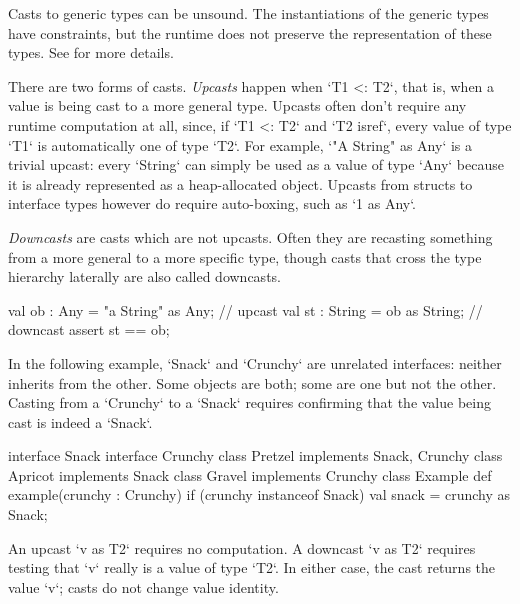 Casts to generic types can be unsound.   The instantiations of the generic
types have constraints, but the runtime does not preserve the representation
of these types.  See  for more details.

There are two forms of casts.  {\em Upcasts} happen when \xcd`T1 <: T2`, that
is, when a value is being cast to a more general type.  Upcasts often don't require
any runtime computation at all, since, if \xcd`T1 <: T2` and 
\xcd`T2 isref`, every value of type
\xcd`T1` is automatically one of type \xcd`T2`.   For example, 
\xcd`"A String" as Any` is a trivial upcast: every \xcd`String` can
simply be used as a value of type \xcd`Any` because it is already
represented as a heap-allocated object.  Upcasts from structs to
interface types however do require auto-boxing, such as \xcd`1 as Any`.  

{\em Downcasts} are casts which are not upcasts.  Often they are recasting
something from a more general to a more specific type, 
though casts that cross the type hierarchy laterally are also called
downcasts.   
\begin{xten}
   val ob : Any = "a String" as Any; // upcast
   val st : String = ob as String;   // downcast
   assert st == ob;
\end{xten}
 

\begin{ex}

In
the following example, \xcd`Snack` and \xcd`Crunchy` are unrelated interfaces:
neither inherits from the other.  Some objects are both; some are one but not
the other.  Casting from a \xcd`Crunchy` to a \xcd`Snack` requires confirming
that the value being cast is indeed a \xcd`Snack`.  
\begin{xten}
interface Snack {}
interface Crunchy {} 
class Pretzel implements Snack, Crunchy{}
class Apricot implements Snack{}
class Gravel  implements Crunchy{}
class Example{
  def example(crunchy : Crunchy) { 
    if (crunchy instanceof Snack) { 
       val snack = crunchy as Snack; 
    } } } 
\end{xten}
%

\end{ex}

An upcast \xcd`v as T2` requires no computation.  
A downcast \xcd`v as T2` requires testing that \xcd`v` really is a value of
type \xcd`T2`.  In either case, the cast returns the value \xcd`v`; casts do
not change value identity.


